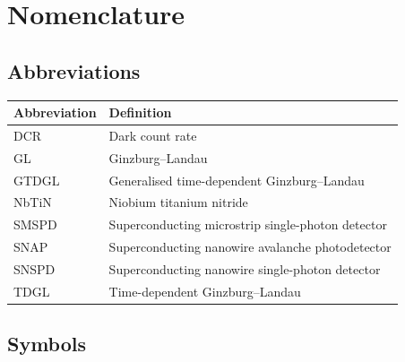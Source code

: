 \chapter*{Nomenclature}

\section*{Abbreviations}

\begin{longtable}{p{2.5cm}p{10cm}}
    \toprule
    Abbreviation & Definition \\
    \midrule\endhead %
    DCR & Dark count rate \\
    GL & Ginzburg--Landau \\
    GTDGL & Generalised time-dependent Ginzburg--Landau \\
    NbTiN & Niobium titanium nitride \\
    SMSPD & Superconducting microstrip single-photon detector \\
    SNAP & Superconducting nanowire avalanche photodetector \\
    SNSPD & Superconducting nanowire single-photon detector \\
    TDGL & Time-dependent Ginzburg--Landau \\
    \bottomrule
\end{longtable}

\section*{Symbols}

